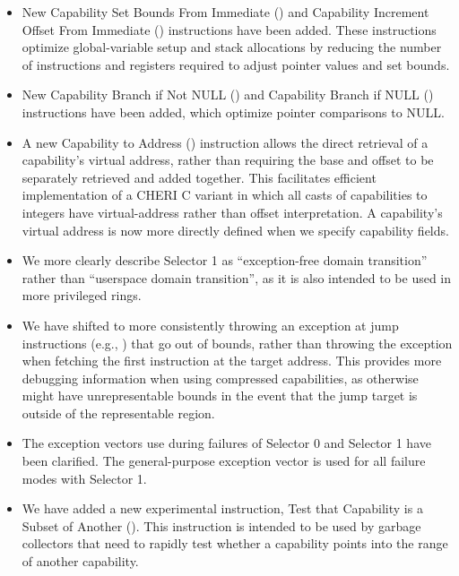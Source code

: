 \begin{itemize}
\item New Capability Set Bounds From Immediate
() and Capability Increment Offset From Immediate
() instructions have been added.
These instructions optimize global-variable setup and stack allocations by
reducing the number of instructions and registers required to adjust pointer
values and set bounds.

\item New Capability Branch if Not NULL () and
Capability Branch if NULL () instructions have
been added, which optimize pointer comparisons to NULL.

\item A new Capability to Address ()
instruction allows the direct retrieval of a capability's virtual address,
rather than requiring the base and offset to be separately retrieved and added
together.
This facilitates efficient implementation of a CHERI C variant in which all
casts of capabilities to integers have virtual-address rather than offset
interpretation.
A capability's virtual address is now more directly defined when we specify
capability fields.

\item We more clearly describe  Selector 1 as
``exception-free domain transition'' rather than ``userspace domain
transition'', as it is also intended to be used in more privileged rings.

\item We have shifted to more consistently throwing an exception at jump
instructions (e.g., ) that go out of bounds,
rather than throwing the exception when fetching the first instruction at
the target address.
This provides more debugging information when using compressed
capabilities, as otherwise \EPCC{} might have unrepresentable bounds in the
event that the jump target is outside of the representable region.

\item The exception vectors use during failures of Selector 0 and Selector 1
 have been clarified.
The general-purpose exception vector is used for all failure modes with
 Selector 1.

\item We have added a new experimental instruction, Test that Capability is a Subset of Another
().
This instruction is intended to be used by garbage collectors that need to
rapidly test whether a capability points into the range of another
capability.


\end{itemize}

